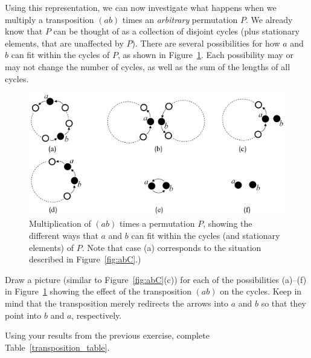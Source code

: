 Using this representation, we can now investigate what happens when we multiply a transposition $(ab)$ times an \emph{arbitrary} permutation $P$. We already know that $P$ can be thought of as a collection of disjoint cycles (plus stationary  elements, that are unaffected by $P$). There are several possibilities for how $a$ and $b$ can fit within the cycles of $P$, as shown in Figure~\ref{fig:abC2}.  Each possibility may or may not change the number of cycles, as well as the sum of the lengths of all cycles.   

\begin{figure}[ht]
\begin{center}
\includegraphics[width=5in]{images/abC2.png}
\caption{Multiplication of $(ab)$ times a permutation $P$, showing the different ways that $a$ and $b$ can fit within the cycles (and stationary elements)  of $P$. Note that  case (a) corresponds to the situation described in Figure~\ref{fig:abC}.) }\label{fig:abC2}
\end{center}
\end{figure}


\begin{exercise}{}
Draw a picture (similar to Figure~\ref{fig:abC}(c)) for each of the possibilities (a)--(f) in Figure~\ref{fig:abC2} showing the effect of the transposition $(ab)$ on the cycles.   Keep in mind that the transposition merely redirects the arrows into $a$ and $b$ so that they point into $b$ and $a$, respectively.
\end{exercise}

\begin{exercise}{}
Using your results from the previous exercise, complete Table~\ref{transposition_table}.
\end{exercise}


